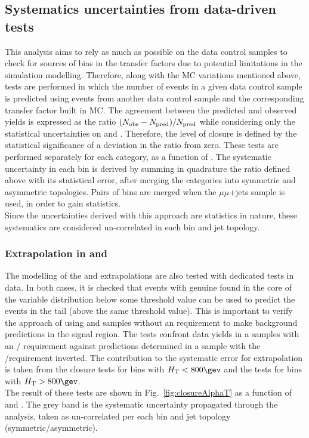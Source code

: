 \subsection{Systematics uncertainties from data-driven tests}
\label{sec:closure-tests}
This analysis aims to rely as much as possible on the data control samples
to check for sources of bias in the transfer factors due to potential limitations in
the simulation modelling. 
Therefore, along with the MC variations mentioned above, tests are performed 
in which the number of events in a given data control sample is predicted 
using events from another data control sample and the corresponding transfer factor built in MC. 
The agreement between the predicted and observed yields is
expressed as the ratio $(\nobs - \npre)/\npre$ while considering only
the statistical uncertainties on \npre and \nobs. Therefore, the level
of closure is defined by the statistical significance of a deviation
in the ratio from zero.
These tests are performed separately for each \njet category, as a function of \scalht. 
The systematic uncertainty in each \scalht bin is derived by summing in quadrature the ratio 
defined above with its statistical error, after merging the \njet categories into symmetric and asymmetric topologies. 
Pairs of \scalht bins are merged when the $\mu\mu$+jets sample is used, in order to gain statistics. \\
Since the uncertainties derived with this approach are statistics in nature, 
these systematics are considered un-correlated in each \scalht bin and jet topology. 


\subsubsection*{Extrapolation in \alphat and \bdphi}
\label{sec:tfSyst_alphaT}
The modelling of the \alphat and
\bdphi extrapolations are also tested with dedicated tests in data. 
In both cases, it is checked that events with genuine \met found in the core
of the variable distribution below some threshold value can be used to
predict the events in the tail (above the same threshold value).
This is important to verify the
approach of using \mj and \mmj samples without an \alphat requirement
to make background predictions in the signal region. The tests
confront data yields in a \mj  samples with an \alphat /\bdphi
requirement against predictions determined in a \mj sample with
the \alphat /\bdphi requirement inverted. 
The contribution to the systematic error for \met extrapolation is taken
from the \alphat closure tests for bins with $\scalht<800\gev$ and
the \bdphi tests for bins with $\scalht>800\gev$. \\
The result of these tests are shown in Fig.~\ref{fig:closureAlphaT} as a function of \scalht and \njet. 
The grey band is the systematic uncertainty propagated through the analysis, 
taken as un-correlated per each \scalht bin and jet topology (symmetric/asymmetric).


